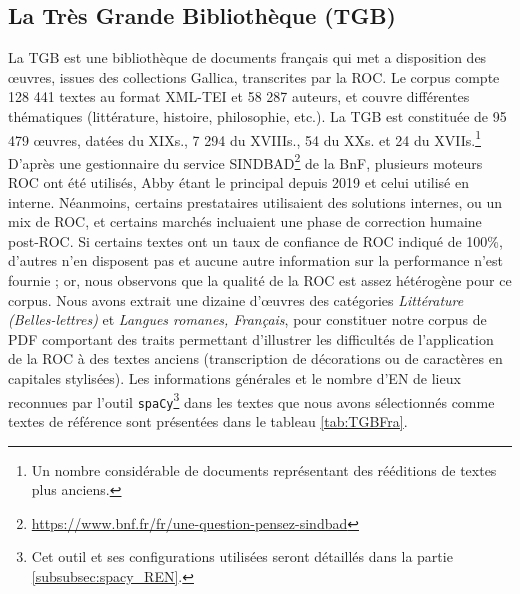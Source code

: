 \subsection{La Très Grande Bibliothèque (TGB)}
La TGB est une bibliothèque de documents français qui met a disposition des œuvres, issues des collections Gallica, transcrites par la ROC. Le corpus compte 128 441 textes au format XML-TEI et 58 287 auteurs, et couvre différentes thématiques (littérature, histoire, philosophie, etc.). La TGB est constituée de 95 479 œuvres, datées du XIX\ieme{}s., 7 294 du XVIII\ieme{}s., 54 du XX\ieme{}s. et 24 du XVII\ieme{}s.\footnote{Un nombre considérable de documents représentant des rééditions de textes plus anciens.} 
D'après une gestionnaire du service SINDBAD\footnote{\url{https://www.bnf.fr/fr/une-question-pensez-sindbad}} de la BnF, plusieurs moteurs ROC ont été utilisés, Abby étant le principal depuis 2019 et celui utilisé en interne. Néanmoins, certains prestataires utilisaient des solutions internes, ou un mix de ROC, et certains marchés incluaient une phase de correction humaine post-ROC. Si certains textes ont un taux de confiance de ROC indiqué de 100\%, d'autres n'en disposent pas et aucune autre information sur la performance n'est fournie ; or, nous observons que la qualité de la ROC est assez hétérogène pour ce corpus. Nous avons extrait une dizaine d'œuvres des catégories \textit{Littérature (Belles-lettres)} et \textit{Langues romanes, Français}, pour constituer notre corpus de PDF comportant des traits permettant d'illustrer les difficultés de l'application de la ROC à des textes anciens (transcription de décorations ou de caractères en capitales stylisées). Les informations générales et le nombre d'EN de lieux reconnues par l'outil \texttt{spaCy}\footnote{Cet outil et ses configurations utilisées seront détaillés dans la partie \ref{subsubsec:spacy_REN}.} dans les textes que nous avons sélectionnés comme textes de référence sont présentées dans le tableau \ref{tab:TGBFra}.
